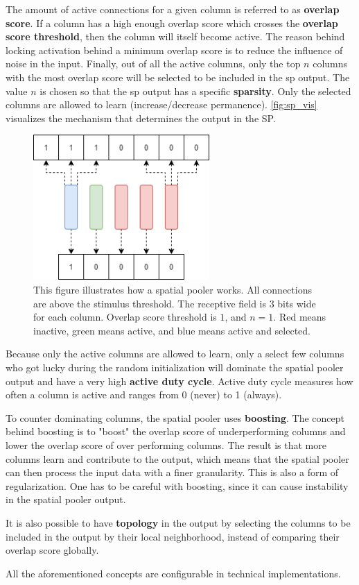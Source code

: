 The amount of active connections for a given column is referred to as \textbf{overlap score}. If a column has a high enough overlap score which crosses the \textbf{overlap score threshold}, then the column will itself become active. The reason behind locking activation behind a minimum overlap score is to reduce the influence of noise in the input. Finally, out of all the active columns, only the top $n$ columns with the most overlap score will be selected to be included in the \gls*{sp} output. The value $n$ is chosen so that the \gls*{sp} output has a specific \textbf{sparsity}. Only the selected columns are allowed to learn (increase/decrease permanence). \autoref{fig:sp_vis} visualizes the mechanism that determines the output in the SP.
\par
\begin{figure}[H]
    \centering
    \includegraphics[width=0.6\textwidth]{resources/related_works/sp_vis.png}
    \caption[Spatial Pooler Workings]{ This figure illustrates how a spatial pooler works. All connections are above the stimulus threshold. The receptive field is 3 bits wide for each column. Overlap score threshold is $1$, and $n=1$. Red means inactive, green means active, and blue means active and selected.}
    \label{fig:sp_vis}
\end{figure}
Because only the active columns are allowed to learn, only a select few columns who got lucky during the random initialization will dominate the spatial pooler output and have a very high \textbf{active duty cycle}. Active duty cycle measures how often a column is active and ranges from 0 (never) to 1 (always). \par
To counter dominating columns, the spatial pooler uses \textbf{boosting}.
The concept behind boosting is to "boost" the overlap score of underperforming columns and lower the overlap score of over performing columns. The result is that more columns learn and contribute to the output, which means that the spatial pooler can then process the input data with a finer granularity. This is also a form of regularization. One has to be careful with boosting, since it can cause instability in the spatial pooler output.
\par
It is also possible to have \textbf{topology} in the output by selecting the columns to be included in the output by their local neighborhood, instead of comparing their overlap score globally.
\par
All the aforementioned concepts are configurable in technical implementations.

